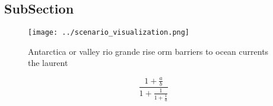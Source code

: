 \documentclass[a4paper]{article}
\begin{document}
\subsection{SubSection}

\begin{figure}
\centering
\texttt{[image: ../scenario\_visualization.png]}
\caption{Antarctica or valley rio grande rise orm barriers to ocean currents the laurent
}
\end{figure}
 
\[ \frac{1+\frac{a}{b}}{1+\frac{1}{1+\frac{1}{a}}} \]
\end{document}

